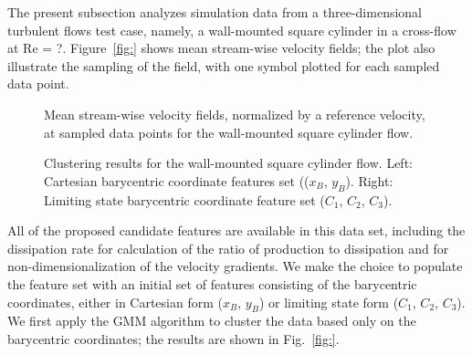 The present subsection analyzes simulation data from a three-dimensional turbulent ﬂows test case, namely, a wall-mounted square cylinder in a cross-ﬂow at Re = ?. Figure~\ref{fig:} shows mean stream-wise velocity ﬁelds; the plot also illustrate the sampling of the ﬁeld, with one symbol plotted for each sampled data point.
%
\begin{figure}[H]%
    \centering
    \caption{Mean stream-wise velocity fields, normalized by a reference velocity, at sampled data points for the wall-mounted square cylinder flow.}
    \label{fig:cylinder_velocity}
\end{figure}
%
\begin{figure}[H]%
    \centering
    \caption{Clustering results for the wall-mounted square cylinder flow. Left: Cartesian barycentric coordinate features set (($x_B$, $y_B$). Right: Limiting state barycentric coordinate feature set ($C_1$, $C_2$, $C_3$).}
    \label{fig:cylinder_cluster}
\end{figure}
%
%
%
All of the proposed candidate features are available in this data set, including the dissipation rate for calculation of the ratio of production to dissipation and for non-dimensionalization of the velocity gradients. We make the choice to populate the feature set with an initial set of features consisting of the barycentric coordinates, either in Cartesian form ($x_B$, $y_B$) or limiting state form ($C_1$, $C_2$, $C_3$). We ﬁrst apply the GMM algorithm to cluster the data based only on the barycentric coordinates; the results are shown in Fig.~\ref{fig:}. %
